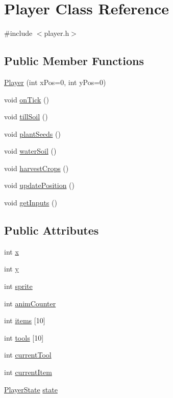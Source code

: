 \hypertarget{class_player}{\section{Player Class Reference}
\label{class_player}
}


{\ttfamily \#include $<$player.\-h$>$}

\subsection*{Public Member Functions}
\begin{DoxyCompactItemize}
\item 
\hyperlink{class_player_a23d14d23255d0c0b291d750f6e9982b1}{Player} (int x\-Pos=0, int y\-Pos=0)
\item 
void \hyperlink{class_player_aa6a9d06e481e62626da52db9a6c79023}{on\-Tick} ()
\item 
void \hyperlink{class_player_abe2b38c7cda8362dcf1063eb1546d778}{till\-Soil} ()
\item 
void \hyperlink{class_player_a552c0385003f06eae35485994b64b990}{plant\-Seeds} ()
\item 
void \hyperlink{class_player_a210c9c1c4ae5a84ceb467ed39d9117c3}{water\-Soil} ()
\item 
void \hyperlink{class_player_a5a013cb0ff7607a6968048780f25505b}{harvest\-Crops} ()
\item 
void \hyperlink{class_player_a1cb7ff18fe3b07cc1dcd27519bde8329}{update\-Position} ()
\item 
void \hyperlink{class_player_a6818aa1ce188127d3e9d0209cdcbcdb4}{get\-Inputs} ()
\end{DoxyCompactItemize}
\subsection*{Public Attributes}
\begin{DoxyCompactItemize}
\item 
int \hyperlink{class_player_ad285b3cb25e4a46ca944b9a416c1b13f}{x}
\item 
int \hyperlink{class_player_a6da29d6e3783c6028c92647bbde478f5}{y}
\item 
int \hyperlink{class_player_aac9bac60b3b27c77a1970f7e7999f5d5}{sprite}
\item 
int \hyperlink{class_player_aa4536c3254fa3b774cd5b04483a3255b}{anim\-Counter}
\item 
int \hyperlink{class_player_a6bcb0c797b73c3ea5e3d8ef797656c92}{items} \mbox{[}10\mbox{]}
\item 
int \hyperlink{class_player_aee04f54f61b45e5912b48fb9203cad38}{tools} \mbox{[}10\mbox{]}
\item 
int \hyperlink{class_player_aec48acba12d8b9245b4ba09146e0113c}{current\-Tool}
\item 
int \hyperlink{class_player_ab3f59417c9a2ee2d8a39a7a20f18dd51}{current\-Item}
\item 
\hyperlink{class_player_a07fe57ec176032714d7d6de076b06ec9}{Player\-State} \hyperlink{class_player_afb60fdad921bce05783ef2709e849c27}{state}
\end{DoxyCompactItemize}
